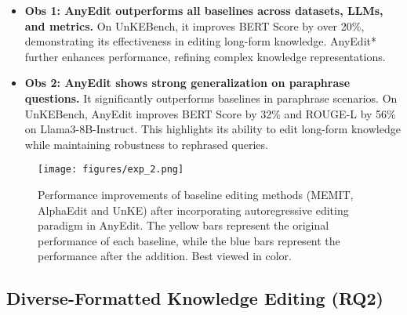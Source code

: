 \begin{itemize}[leftmargin=*]
    \item \textbf{Obs 1: AnyEdit outperforms all baselines across datasets, LLMs, and metrics.}  
    On UnKEBench, it improves BERT Score by over 20\%, demonstrating its effectiveness in editing long-form knowledge. AnyEdit* further enhances performance, refining complex knowledge representations.

     \item \textbf{Obs 2: AnyEdit shows strong generalization on paraphrase questions.}  
    It significantly outperforms baselines in paraphrase scenarios. On UnKEBench, AnyEdit improves BERT Score by 32\% and ROUGE-L by 56\% on Llama3-8B-Instruct. This highlights its ability to edit long-form knowledge while maintaining robustness to rephrased queries.
\end{itemize}



\begin{figure*}[t]
    \centering
    \texttt{[image: figures/exp\_2.png]}
    \caption{Performance improvements of baseline editing methods (\ie MEMIT, AlphaEdit and UnKE) after incorporating  autoregressive editing paradigm in AnyEdit. The yellow bars represent the original performance of each baseline, while the blue bars represent the performance after the addition. Best viewed in color.}
    \label{fig:exp_2}
\end{figure*}
\subsection{Diverse-Formatted Knowledge Editing (RQ2)}  

